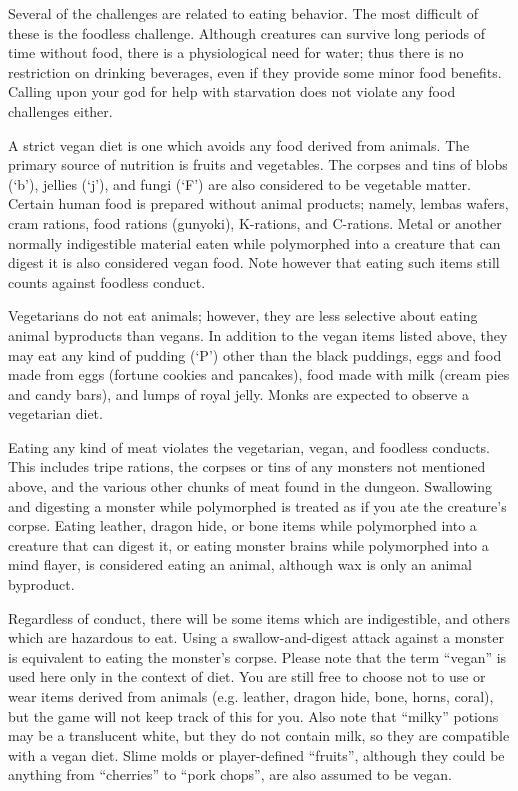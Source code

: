 Several of the challenges are related to eating behavior.  The most
difficult of these is the foodless challenge.  Although creatures
can survive long periods of time without food, there is a physiological
need for water; thus there is no restriction on drinking beverages,
even if they provide some minor food benefits.
Calling upon your god for help with starvation does
not violate any food challenges either.

A strict vegan diet is one which avoids any food derived from animals.
The primary source of nutrition is fruits and vegetables.  The
corpses and tins of blobs (`b'), jellies (`j'), and fungi (`F') are
also considered to be vegetable matter.  Certain human
food is prepared without animal products; namely, lembas wafers, cram
rations, food rations (gunyoki), K-rations, and C-rations.
Metal or another normally indigestible material eaten while polymorphed
into a creature that can digest it is also considered vegan food.
Note however that eating such items still counts against foodless conduct.

Vegetarians do not eat animals;
however, they are less selective about eating animal byproducts than vegans.
In addition to the vegan items listed above, they may eat any kind
of pudding (`P') other than the black puddings,
eggs and food made from eggs (fortune cookies and pancakes),
food made with milk (cream pies and candy bars), and lumps of
royal jelly.  Monks are expected to observe a vegetarian diet.

Eating any kind of meat violates the vegetarian, vegan, and foodless
conducts.  This includes tripe rations, the corpses or tins of any
monsters not mentioned above, and the various other chunks of meat
found in the dungeon.  Swallowing and digesting a monster while polymorphed
is treated as if you ate the creature's corpse.
Eating leather, dragon hide, or bone items while
polymorphed into a creature that can digest it, or eating monster brains
while polymorphed into a mind flayer, is considered eating
an animal, although wax is only an animal byproduct.

Regardless of conduct, there will be some items which are indigestible,
and others which are hazardous to eat.  Using a swallow-and-digest
attack against a monster is equivalent to eating the monster's corpse.
Please note that the term ``vegan'' is used here only in the context of
diet.  You are still free to choose not to use or wear items derived
from animals (e.g. leather, dragon hide, bone, horns, coral), but the
game will not keep track of this for you.  Also note that ``milky''
potions may be a translucent white, but they do not contain milk,
so they are compatible with a vegan diet.  Slime molds or
player-defined ``fruits'', although they could be anything
from ``cherries'' to ``pork chops'', are also assumed to be vegan.


